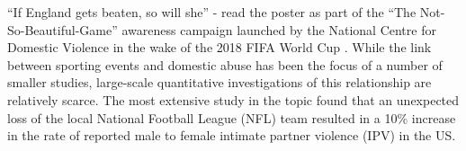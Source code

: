 \documentclass[12pt, letterpaper]{article}
\newcommand{\TM}[1] {{\textcolor{orange}{#1}}}
\begin{document}



\newpage

``If England gets beaten, so will she'' - read the poster as part of the ``The Not-So-Beautiful-Game'' awareness campaign launched by the National Centre for Domestic Violence in the wake of the 2018 FIFA World Cup \autocite{NCDV}. While the link between sporting events and domestic abuse has been the focus of a number of smaller studies\autocite{Williams2014}, large-scale quantitative investigations of this relationship are relatively scarce. The most extensive study in the topic found that an unexpected loss of the local National Football League (NFL) team resulted in a 10\% increase in the rate of reported male to female intimate partner violence (IPV) in the US\autocite{Card2011}. 
\end{document}
